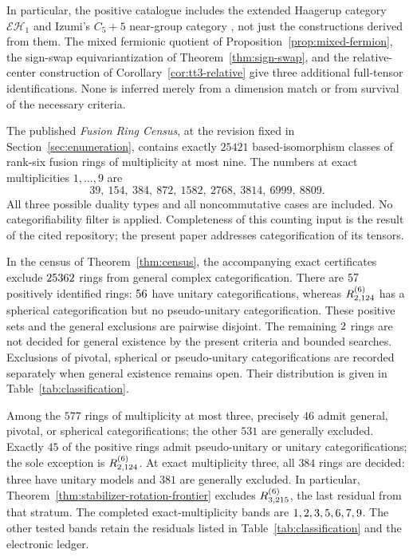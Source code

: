In particular, the positive catalogue includes the extended Haagerup
category $\mathcal{EH}_1$ \cite{BMPS,GMPPS,BPEH} and Izumi's $C_5+5$ near-group
category \cite{Izumi}, not just the constructions derived from them.
The mixed fermionic quotient of Proposition~\ref{prop:mixed-fermion}, the
sign-swap equivariantization of Theorem~\ref{thm:sign-swap}, and the
relative-center construction of Corollary~\ref{cor:tt3-relative} give
three additional full-tensor identifications. None is inferred merely
from a dimension match or from survival of the necessary criteria.

\begin{theorem}\label{thm:census}
The published \emph{Fusion Ring Census}, at the revision fixed in
Section~\ref{sec:enumeration}, contains exactly $25421$
based-isomorphism classes of rank-six fusion rings of multiplicity at
most nine. The numbers at exact multiplicities $1,\ldots,9$ are
\[
39,\ 154,\ 384,\ 872,\ 1582,\ 2768,\ 3814,\ 6999,\ 8809.
\]
All three possible duality types and all noncommutative cases are
included. No categorifiability filter is applied. Completeness of this
counting input is the result of the cited repository; the present paper
addresses categorification of its tensors.
\end{theorem}

\begin{theorem}\label{thm:classification}
In the census of Theorem~\ref{thm:census}, the accompanying exact
certificates exclude $25362$ rings from general complex
categorification. There are $57$ positively identified rings:
$56$ have unitary categorifications, whereas $R^{(6)}_{2,124}$ has
a spherical categorification but no pseudo-unitary categorification.
These positive sets and the general exclusions are pairwise disjoint.
The remaining $2$ rings are not decided for general existence by the present criteria and bounded searches. Exclusions of pivotal, spherical or pseudo-unitary categorifications are recorded separately when general existence remains open. Their distribution is given in
Table~\ref{tab:classification}.

Among the $577$ rings of multiplicity at most three, precisely $46$
admit general, pivotal, or spherical categorifications; the other $531$
are generally excluded. Exactly $45$ of the positive rings admit
pseudo-unitary or unitary categorifications; the sole exception is
$R^{(6)}_{2,124}$. At exact multiplicity three, all $384$ rings are decided:
three have unitary models and $381$ are generally excluded. In particular,
Theorem~\ref{thm:stabilizer-rotation-frontier} excludes $R^{(6)}_{3,215}$,
the last residual from that stratum. The completed exact-multiplicity
bands are $1, 2, 3, 5, 6, 7, 9$. The other tested bands retain the residuals
listed in Table~\ref{tab:classification} and the electronic ledger.
\end{theorem}

